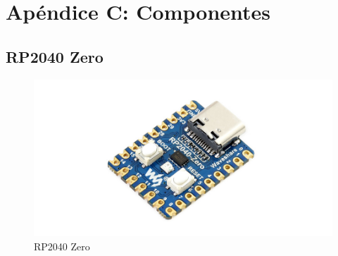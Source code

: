 \chapter{Apéndice C: Componentes}
\renewcommand{\thepage}{C-\arabic{page}}
\setcounter{page}{1}

    \section{RP2040 Zero}
    \label{rp2040}
            \begin{figure}[!ht]
                \centering
                \includegraphics[width=0.7\linewidth]{Anexo_C/RP2040 Zero.png}
                \caption{RP2040 Zero}
                \label{fig:c1}
            \end{figure}
            
